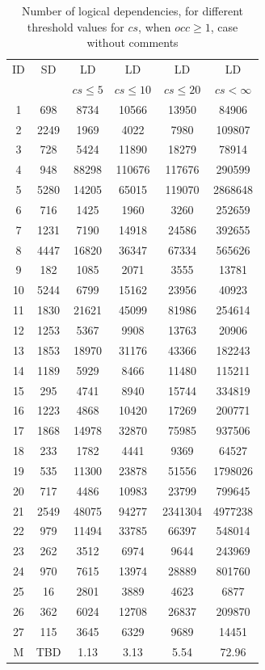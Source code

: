 \documentclass[a4paper,twoside]{article}
\begin{document}
\begin{table}[!h]
\renewcommand{\arraystretch}{1.25}
\caption{Number of logical dependencies, for different threshold values for $cs$, when $occ\geq 1$, case without comments}
\label{table:6}
\centering
\begin{tabular}{|c|c|c|c|c|c|}
\hline
ID  & SD & LD	&	LD	&	LD	&	LD \\
      &   & $cs\leq 5$	&	$cs\leq 10$	&	$cs\leq 20$	&	$cs< \infty$ \\
\hline
1	&	698	&	8734	&	10566	&	13950	&	84906	\\
2	&	2249	&	1969	&	4022	&	7980	&	109807	\\
3	&	728	&	5424	&	11890	&	18279	&	78914	\\
4	&	948	&	88298	&	110676	&	117676	&	290599	\\
5	&	5280	&	14205	&	65015	&	119070	&	2868648	\\
6	&	716	&	1425	&	1960	&	3260	&	252659	\\
7	&	1231	&	7190	&	14918	&	24586	&	392655	\\
8	&	4447	&	16820	&	36347	&	67334	&	565626	\\
9	&	182	&	1085	&	2071	&	3555	&	13781	\\
10	&	5244	&	6799	&	15162	&	23956	&	40923	\\
11	&	1830	&	21621	&	45099	&	81986	&	254614	\\
12	&	1253	&	5367	&	9908	&	13763	&	20906	\\
13	&	1853	&	18970	&	31176	&	43366	&	182243	\\
14	&	1189	&	5929	&	8466	&	11480	&	115211	\\
15	&	295	&	4741	&	8940	&	15744	&	334819	\\
16	&	1223	&	4868	&	10420	&	17269	&	200771	\\
17	&	1868	&	14978	&	32870	&	75985	&	937506	\\
18	&	233	&	1782	&	4441	&	9369	&	64527	\\
19	&	535	&	11300	&	23878	&	51556	&	1798026	\\
20	&	717	&	4486	&	10983	&	23799	&	799645	\\
21	&	2549	&	48075	&	94277	&	2341304	&	4977238	\\
22	&	979	&	11494	&	33785	&	66397	&	548014	\\
23	&	262	&	3512	&	6974	&	9644	&	243969	\\
24	&	970	&	7615	&	13974	&	28889	&	801760	\\
25	&	16	&	2801	&	3889	&	4623	&	6877	\\
26	&	362	&	6024	&	12708	&	26837	&	209870	\\
27	&	115	&	3645	&	6329	&	9689	&	14451	\\
\hline
M	&	TBD&	1.13	&	3.13	&	5.54	&	72.96	\\
\hline
\end{tabular}
\end{table}
\end{document}
